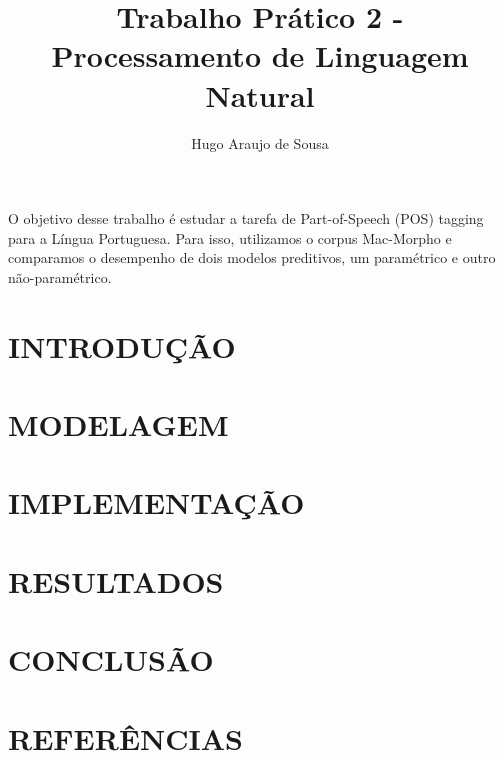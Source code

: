 \documentclass[12pt]{article}
\title{Trabalho Prático 2 - Processamento de Linguagem Natural}
\author{Hugo Araujo de Sousa}
\begin{document}
 

\maketitle
     
\begin{resumo} 
  O objetivo desse trabalho é estudar a tarefa de Part-of-Speech (POS) tagging
  para a Língua Portuguesa. Para isso, utilizamos o corpus Mac-Morpho e comparamos
  o desempenho de dois modelos preditivos, um paramétrico e outro não-paramétrico.
\end{resumo}

\section{INTRODUÇÃO}



\section{MODELAGEM}



\section{IMPLEMENTAÇÃO}



\section{RESULTADOS}



\section{CONCLUSÃO}



\section{REFERÊNCIAS}



\end{document}

